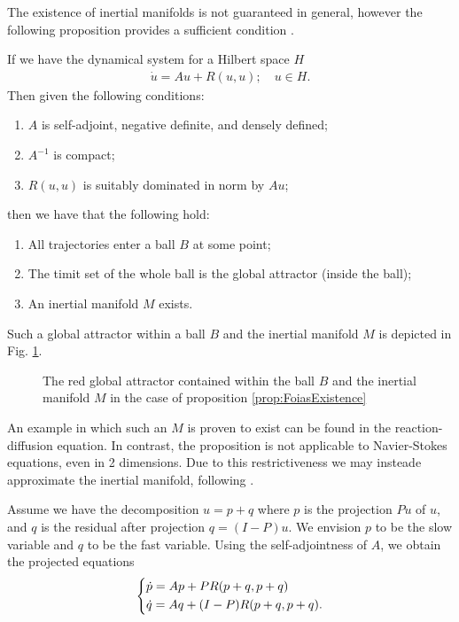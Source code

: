 The existence of inertial manifolds is not guaranteed in general, however the following proposition provides a sufficient condition \cite{FoiasInertial}.
\begin{proposition}[] \label{prop:FoiasExistence}
	If we have the dynamical system for a Hilbert space $H$
	\begin{align}
		\dot{u} = Au + R(u,u);\quad u\in H.
	\end{align}
Then given the following conditions:
\begin{enumerate}
	\item $A$ is self-adjoint, negative definite, and densely defined;
	\item $A^{-1}$ is compact;
	\item $R(u,u)$ is suitably dominated in norm by $Au$;
\end{enumerate}
then we have that the following hold:
\begin{enumerate}
	\item All trajectories enter a ball $B$ at some point;
	\item The timit set of the whole ball is the global attractor (inside the ball);
	\item An inertial manifold $M$ exists.
\end{enumerate}
Such a global attractor within a ball $B$ and the inertial manifold $M$ is depicted in Fig. \ref{fig:FoiaProp}.
\end{proposition}
\begin{figure}[h!]
	\centering
	\caption{The red global attractor contained within the ball $B$ and the inertial manifold $M$ in the case of proposition \ref{prop:FoiasExistence}}
	\label{fig:FoiaProp}
\end{figure}

An example in which such an $M$ is proven to exist can be found in the reaction-diffusion equation. In contrast, the proposition is not applicable to Navier-Stokes equations, even in 2 dimensions. Due to this restrictiveness we may insteade approximate the inertial manifold, following \cite{FoiasApprox}.

Assume we have the decomposition $u=p+q$ where $p$ is the projection $Pu$ of $u$, and $q$ is the residual after projection $q=(I-P)u$. We envision $p$ to be the slow variable and $q$ to be the fast variable. Using the self-adjointness of $A$, we obtain the projected equations
\begin{align}
	\begin{dcases}
		\dot{p} = Ap + PR(p+q, p+q) \\
		\dot{q} = Aq + (I-P)R(p+q, p+q).
	\end{dcases}
\end{align}


